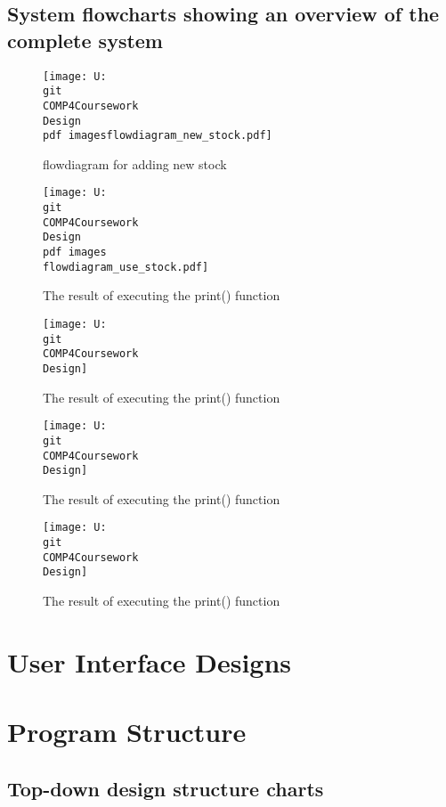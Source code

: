 \subsection{System flowcharts showing an overview of the complete system}

\begin{figure}[H]
    \texttt{[image: U:\\git\\COMP4Coursework\\Design\\pdf imagesflowdiagram\_new\_stock.pdf]}
    \caption{flowdiagram for adding new stock} \label{fig:new stock flowchart}
\end{figure}


\begin{figure}[H]
    \texttt{[image: U:\\git\\COMP4Coursework\\Design\\pdf images\\flowdiagram\_use\_stock.pdf]}
    \caption{The result of executing the print() function} \label{fig:print_function_result}
\end{figure}


\begin{figure}[H]
    \texttt{[image: U:\\git\\COMP4Coursework\\Design]}
    \caption{The result of executing the print() function} \label{fig:print_function_result}
\end{figure}


\begin{figure}[H]
    \texttt{[image: U:\\git\\COMP4Coursework\\Design]}
    \caption{The result of executing the print() function} \label{fig:print_function_result}
\end{figure}


\begin{figure}[H]
    \texttt{[image: U:\\git\\COMP4Coursework\\Design]}
    \caption{The result of executing the print() function} \label{fig:print_function_result}
\end{figure}

\section{User Interface Designs}

\section{Program Structure}

\subsection{Top-down design structure charts}

